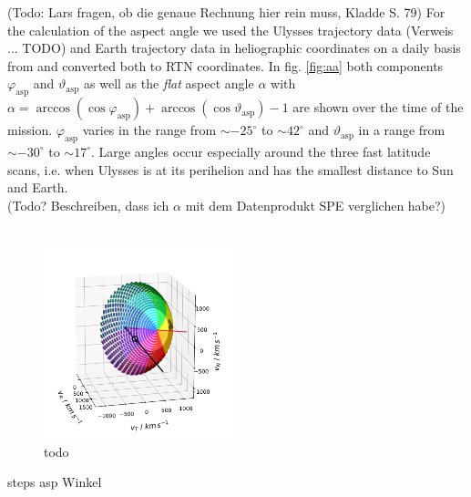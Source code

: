 (Todo: Lars fragen, ob die genaue Rechnung hier rein muss, Kladde S. 79)
For the calculation of the aspect angle we used the Ulysses trajectory data (Verweis ... TODO) and Earth trajectory data in heliographic coordinates on a daily basis from \citet{nasa-earth-coord} and converted both to RTN coordinates. In fig. \ref{fig:aa} both components $\varphi_{\mathrm{asp}}$ and $\vartheta_{\mathrm{asp}}$ as well as the \textit{flat} aspect angle $\alpha$ with  $\alpha = \arccos(\cos{\varphi_{\mathrm{asp}}}) + \arccos(\cos{\vartheta_{\mathrm{asp}}}) -1$ are shown over the time of the mission. $\varphi_{\mathrm{asp}}$ varies in the range from $\sim - 25^\circ$ to $\sim 42^\circ$ and $\vartheta_{\mathrm{asp}}$ in a range from $\sim - 30^\circ$ to $\sim 17^\circ$. Large angles occur especially around the three fast latitude scans, i.e. when Ulysses is at its perihelion and has the smallest distance to Sun and Earth.\\
(Todo? Beschreiben, dass ich $\alpha$ mit dem Datenprodukt SPE verglichen habe?)
\\ \\
\begin{figure}[h]
	\includegraphics[width=0.5\textwidth]{Figures/col_aa_marker.png}
	\centering
	\caption{todo}
	\label{fig:col_aa}
\end{figure}
steps asp Winkel

